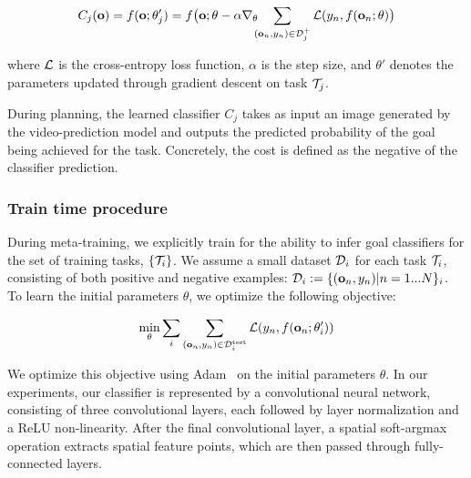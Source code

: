 $$
C_j(\mathbf{o})
= f(\mathbf{o}; \theta_j')
= f\big(\mathbf{o}; \theta-\alpha \nabla_\theta \!\!\! \sum_{(\mathbf{o}_n, y_n)\in \mathcal{D}^+_j} \mathcal{L} (y_n, f(\mathbf{o}_n; \theta)\big)
$$

where $\mathcal{L}$ is the cross-entropy loss function, $\alpha$ is the step size, and $\theta'$ denotes the parameters updated through gradient descent on task $\mathcal{T}_j$.

During planning, the learned classifier $C_j$ takes as input an image generated by the video-prediction model and outputs the predicted probability of the goal being achieved for the task. Concretely, the cost is defined as the negative of the classifier prediction.


\subsubsection{Train time procedure}
During meta-training, we explicitly train for the ability to infer goal classifiers for the set of training tasks, $\{ \mathcal{T}_i \}$. We assume a small dataset $\mathcal{D}_i$ for each task $\mathcal{T}_i$, consisting of both positive and negative examples: $\mathcal{D}_i:= \{(\mathbf{o}_n,y_n) | n=1...N \}_i$. To learn the initial parameters $\theta$, we optimize the following objective:

$$
\min_\theta \sum_i \sum_{(\mathbf{o}_n, y_n) \in \mathcal{D}^\text{test}_i} \mathcal{L}(y_n, f(\mathbf{o}_n; \theta_i')) 
$$

We optimize this objective using Adam~\cite{ADAM} on the initial parameters $\theta$. In our experiments, our classifier is represented by a convolutional neural network, consisting of three convolutional layers, each followed by layer normalization and a ReLU non-linearity. After the final convolutional layer, a spatial soft-argmax operation extracts spatial feature points, which are then passed through fully-connected layers.